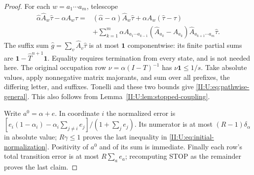 \begin{proof}
For each $w=a_1\cdots a_m$, telescope
\begin{align*}
 \widehat\alpha\widehat A_w\widehat\tau-\alpha A_w\tau
 ={}&(\widehat\alpha-\alpha)\widehat A_w\widehat\tau
       +\alpha A_w(\widehat\tau-\tau)\\
 &+\sum_{k=1}^m\alpha A_{a_1\cdots a_{k-1}}
       (\widehat A_{a_k}-A_{a_k})
       \widehat A_{a_{k+1}\cdots a_m}\widehat\tau.
\end{align*}
The suffix sum $\widehat g=\sum_v\widehat A_v\widehat\tau$ is at most
$\mathbf1$ componentwise: its finite partial sums are
$\mathbf1-\widehat T^{n+1}\mathbf1$. Equality requires termination
from every state, and is not needed here. The original occupation row
$\nu=\alpha(I-T)^{-1}$ has $\nu\mathbf1\le1/s$.
Take absolute values, apply nonnegative matrix majorants, and sum over
all prefixes, the differing letter, and suffixes. Tonelli and these
two bounds give \eqref{II:U:eq:pathwise-general}. This also follows from
Lemma~\ref{II:U:lem:stopped-coupling}.

Write $a^0=\alpha+e$. In coordinate $i$ the normalized error is
$[e_i(1-\alpha_i)-\alpha_i\sum_{j\ne i}e_j]/(1+\sum_j e_j)$.
Its numerator is at most $(R-1)\delta_\alpha$ in absolute value;
$R\gamma\le1$ proves the last inequality in
\eqref{II:U:eq:initial-normalization}. Positivity of $a^0$ and of its sum
is immediate. Finally each row's total transition error is at most
$R\sum_a e_a$; recomputing STOP as the remainder proves the last claim.
\end{proof}
